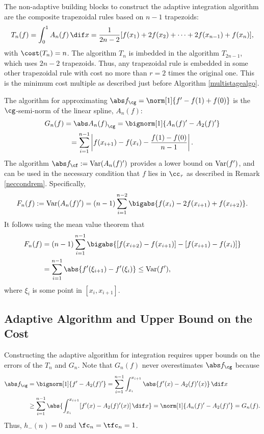 The non-adaptive building blocks to construct the adaptive integration algorithm are the composite trapezoidal rules based on $n-1$ trapezoids:
\begin{equation*}
    T_{n}(f) = \int_0^1 A_n(f) \, \dif x
    =\frac{1}{2n-2}[f(x_1)+2f(x_2)+\cdots+2f(x_{n-1})+f(x_n)],
\end{equation*}
with $\cost(T_n)=n$.  The algorithm $T_n$ is imbedded in the algorithm $T_{2n-1}$, which uses $2n-2$ trapezoids.  Thus, any trapezoidal rule is embedded in some other trapezoidal rule with cost no more than $r=2$ times the original one.  This is the minimum cost multiple as described just before Algorithm \ref{multistagealgo}.

The algorithm for approximating $\Gnorm{f}=\norm[1]{f'-f(1)+f(0)}$ is the $\cg$-semi-norm of the linear spline, $A_n(f)$:
\begin{multline}\label{1direst}
    G_n(f)=\Gnorm{A_n(f)}=\bignorm[1]{A_n(f)'-A_2(f)'} \\
    =\sum_{i=1}^{n-1}\left|f(x_{i+1})-f(x_{i}) - \frac{f(1)-f(0)}{n-1}\right|.
\end{multline}
The algorithm $\Fnorm{f}:=\Var(A_n(f)')$  provides a lower bound on $\operatorname{Var}(f')$, and can be used in the necessary condition that $f$ lies in $\cc_\tau$ as described in Remark \ref{neccondrem}.  Specifically,
\begin{equation} \label{Fnormalg}
F_n(f) :=\Var(A_n(f)') = (n-1)\sum_{i=1}^{n-2} \bigabs{f(x_i) - 2 f(x_{i+1})+f(x_{i+2})}.
\end{equation}
It follows using the mean value theorem that
\begin{align*}
F_n(f) &= (n-1)\sum_{i=1}^{n-1} \bigabs{[f(x_{i+2}) - f(x_{i+1})] - [f(x_{i+1}) - f(x_{i})]} \\
&= \sum_{i=1}^{n-1} \abs{f'(\xi_{i+1}) - f'(\xi_{i})} \le \Var(f'),
\end{align*}
where $\xi_i$ is some point in $[x_i,x_{i+1}]$.


\subsection{Adaptive Algorithm and Upper Bound on the Cost}

Constructing the adaptive algorithm for integration requires upper bounds on the errors of the $T_n$ and $G_n$.  Note that $G_{n}(f)$ never overestimates $\Gnorm{f}$ because
\begin{align*}
\Gnorm{f} & = \bignorm[1]{f'-A_2(f)'}
= \sum_{i=1}^{n-1} \int_{x_i}^{x_{i+1}} \abs{f'(x) - A_2(f)'(x)} \, \dif x \\
& \ge \sum_{i=1}^{n-1} \abs{\int_{x_i}^{x_{i+1}} [f'(x) - A_2(f)'(x)] \, \dif x}=\norm[1]{A_n(f)'-A_2(f)'} = G_n(f).
\end{align*}
Thus, $h_{-}(n)=0$ and $\fc_n=\tfc_n=1$.


